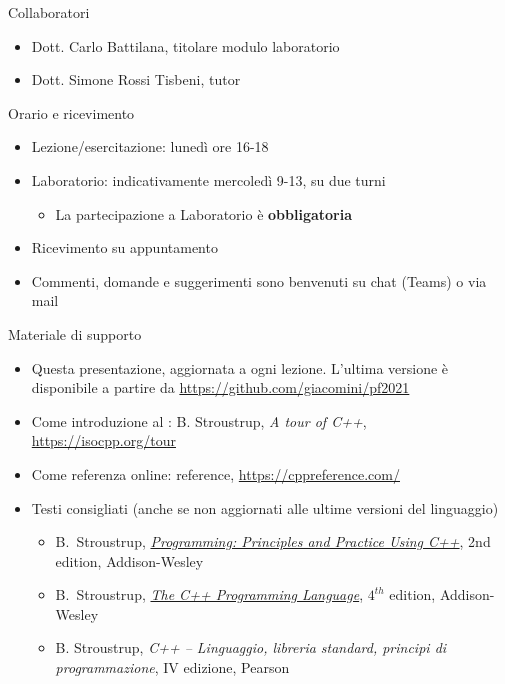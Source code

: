 
\begin{frame}{Collaboratori}

  \begin{itemize}
  \item Dott. Carlo Battilana, titolare modulo laboratorio
  \item Dott. Simone Rossi Tisbeni, tutor
  \end{itemize}

\end{frame}

\begin{frame}{Orario e ricevimento}
  \begin{itemize}
  \item Lezione/esercitazione: lunedì ore 16-18
  \item Laboratorio: indicativamente mercoledì 9-13, su due turni
    \begin{itemize}
    \item La partecipazione a Laboratorio è \textbf{obbligatoria}
    \end{itemize}
  \item Ricevimento su appuntamento
  \item Commenti, domande e suggerimenti sono benvenuti su chat (Teams) o via
    mail
  \end{itemize}
\end{frame}

\begin{frame}{Materiale di supporto}

  \begin{itemize}

  \item Questa presentazione, aggiornata a ogni lezione. L'ultima versione è
    disponibile a partire da \url{https://github.com/giacomini/pf2021}

  \item Come introduzione al \Cpp{}: B. Stroustrup, \textit{A tour of C++},
    \url{https://isocpp.org/tour}

  \item Come referenza online: \Cpp{} reference, \url{https://cppreference.com/}

  \item Testi consigliati (anche se non aggiornati alle ultime versioni del
    linguaggio)
    \begin{itemize}
    \item B.~Stroustrup,
      \href{https://stroustrup.com/programming.html}{\textit{Programming:
          Principles and Practice Using C++}}, 2nd edition, Addison-Wesley

    \item B.~Stroustrup, \href{https://stroustrup.com/4th.html}{\textit{The C++
          Programming Language}}, $4^{th}$ edition, Addison-Wesley

    \item B. Stroustrup, \textit{C++ -- Linguaggio, libreria standard, principi
        di programmazione}, IV edizione, Pearson
    \end{itemize}
  \end{itemize}
\end{frame}

